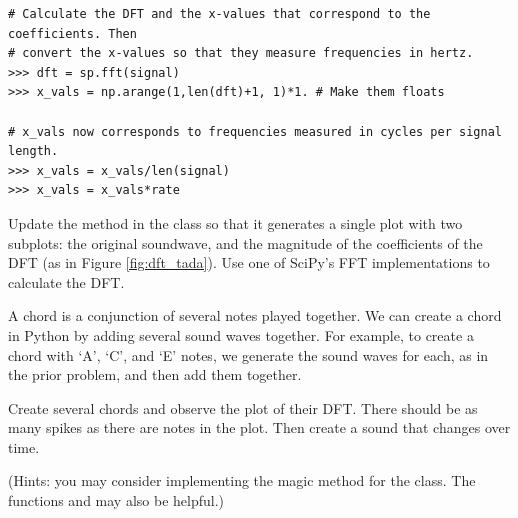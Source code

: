 \begin{lstlisting}
# Calculate the DFT and the x-values that correspond to the coefficients. Then
# convert the x-values so that they measure frequencies in hertz.
>>> dft = sp.fft(signal)
>>> x_vals = np.arange(1,len(dft)+1, 1)*1. # Make them floats

# x_vals now corresponds to frequencies measured in cycles per signal length.
>>> x_vals = x_vals/len(signal)
>>> x_vals = x_vals*rate
\end{lstlisting}

\begin{problem}
Update the  method in the  class so that it generates a single plot with two subplots: the original soundwave, and the magnitude of the coefficients of the DFT (as in Figure \ref{fig:dft_tada}).
Use one of SciPy's FFT implementations to calculate the DFT.
\end{problem}

\begin{problem}
A chord is a conjunction of several notes played together.
We can create a chord in Python by adding several sound waves together.
For example, to create a chord with `A', `C', and `E' notes, we generate the sound waves for each, as in the prior problem, and then add them together.

Create several chords and observe the plot of their DFT.
There should be as many spikes as there are notes in the plot.
Then create a sound that changes over time.

(Hints: you may consider implementing the  magic method for the  class.
The functions  and  may also be helpful.)
\end{problem}


